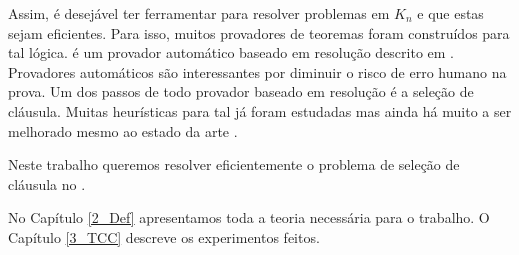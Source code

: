Assim, é desejável ter ferramentar para resolver problemas em $K_n$ e que estas sejam eficientes. Para isso, muitos provadores de teoremas foram construídos para tal lógica. \ksp é um provador automático baseado em resolução descrito em \cite{Nalon2020}. Provadores automáticos são interessantes por diminuir o risco de erro humano na prova. Um dos passos de todo provador baseado em resolução é a seleção de cláusula. Muitas heurísticas para tal já foram estudadas mas ainda há muito a ser melhorado mesmo ao estado da arte \cite{stephan}.


Neste trabalho queremos resolver eficientemente o problema de seleção de cláusula no \ksp.


No Capítulo \ref{2_Def} apresentamos toda a teoria necessária para o trabalho. O Capítulo \ref{3_TCC} descreve os experimentos feitos.


